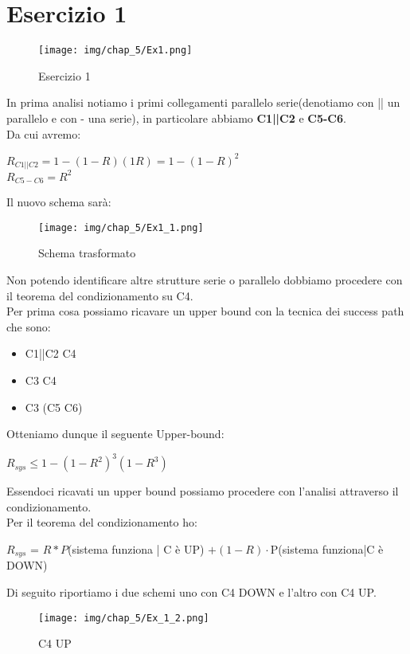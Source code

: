 \section{Esercizio 1}
\begin{figure}[H]
    \centering
    \texttt{[image: img/chap\_5/Ex1.png]}
    \caption{Esercizio 1}
    \label{fig:Ex_1}
\end{figure}
\noindent
In prima analisi notiamo i primi collegamenti parallelo serie(denotiamo con || un parallelo e con - una serie), in particolare abbiamo \textbf{C1||C2} e \textbf{C5-C6}.\\
Da cui avremo:
\begin{center}
        $R_{C1||C2} = 1-(1-R)(1R) = 1-(1-R)^2$\\
        $R_{C5-C6} = R^2$
\end{center} 
Il nuovo schema sarà:
\begin{figure}[H]
    \centering
    \texttt{[image: img/chap\_5/Ex1\_1.png]}
    \caption{Schema trasformato}
    \label{fig:Ex_1_1}
\end{figure}
\noindent
Non potendo identificare altre strutture serie o parallelo dobbiamo procedere con il teorema del condizionamento su C4.\\
Per prima cosa possiamo ricavare un upper bound con la tecnica dei success path che sono:
\begin{itemize}
    \item C1||C2 \textminus{} C4
    \item C3 \textminus{} C4
    \item C3 \textminus{} (C5 \textminus{} C6)
\end{itemize}
Otteniamo dunque il seguente Upper-bound:
\begin{center}
    $
        R_{sys} \leq 1-(1-R^2)^3(1-R^3)
    $
\end{center}
Essendoci ricavati un upper bound possiamo procedere con l'analisi attraverso il condizionamento.\\
Per il teorema del condizionamento ho:\\
\begin{center}
    $R_{sys}$ = $R*P$(sistema funziona | C è UP) $+ (1-R) \cdot $P(sistema funziona|C è DOWN)
\end{center}
Di seguito riportiamo i due schemi uno con C4 DOWN e l'altro con C4 UP.\\
\begin{figure}[H]
    \centering
    \texttt{[image: img/chap\_5/Ex\_1\_2.png]}
    \caption{C4 UP}
    \label{fig:Ex_1_2}
\end{figure}

